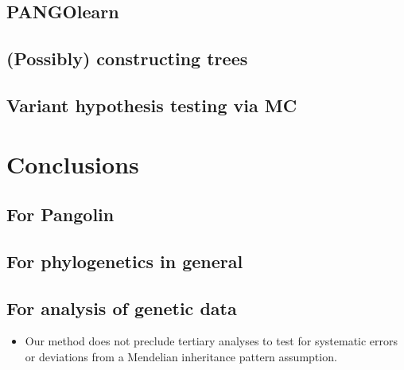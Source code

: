 \documentclass[
]{article}
\providecommand{\tightlist}{%
  \setlength{\itemsep}{0pt}\setlength{\parskip}{0pt}}
\begin{document}
\hypertarget{pangolearn}{%
\subsection{PANGOlearn}\label{pangolearn}}

\hypertarget{possibly-constructing-trees}{%
\subsection{(Possibly) constructing
trees}\label{possibly-constructing-trees}}

\hypertarget{variant-hypothesis-testing-via-mc}{%
\subsection{Variant hypothesis testing via
MC}\label{variant-hypothesis-testing-via-mc}}

\hypertarget{conclusions}{%
\section{Conclusions}\label{conclusions}}

\hypertarget{for-pangolin}{%
\subsection{For Pangolin}\label{for-pangolin}}

\hypertarget{for-phylogenetics-in-general}{%
\subsection{For phylogenetics in
general}\label{for-phylogenetics-in-general}}

\hypertarget{for-analysis-of-genetic-data}{%
\subsection{For analysis of genetic
data}\label{for-analysis-of-genetic-data}}

\begin{itemize}
\tightlist
\item
  Our method does not preclude tertiary analyses to test for systematic
  errors or deviations from a Mendelian inheritance pattern assumption.
\end{itemize}

  
\end{document}
